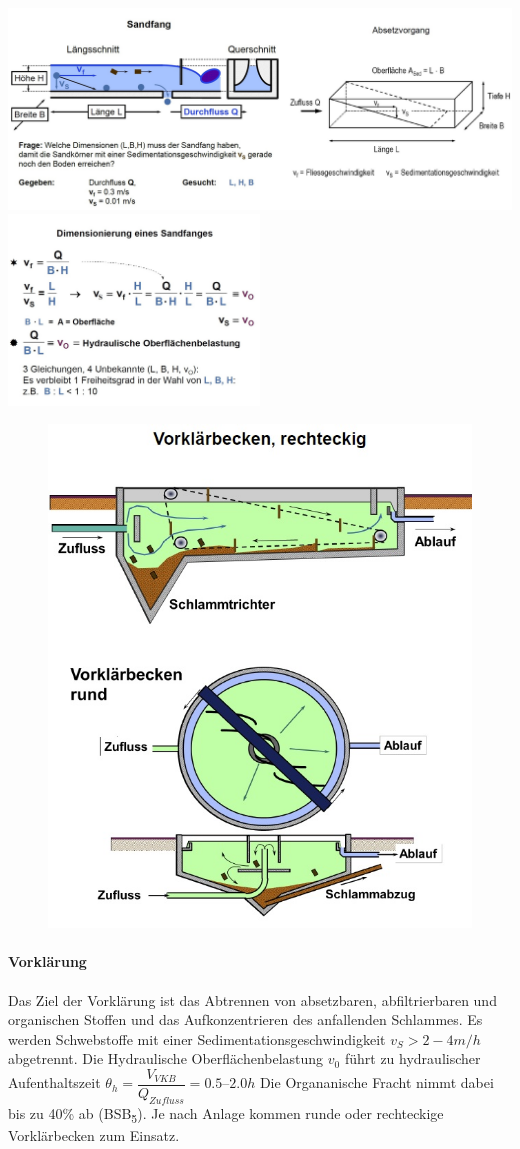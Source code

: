 \documentclass[9pt, openright=false]{scrartcl}
\begin{document}
\begin{center}
\includegraphics[width=1.0\textwidth]{images/dimensionsandfang1}
\includegraphics[width=0.5\textwidth]{images/dimensionsandfang2}
\end{center}\clearpage \begin{figure} 
  \includegraphics[width=.45\textwidth]{images/vorklaerbecken}
\end{figure}
\paragraph{Vorklärung} Das Ziel der Vorklärung ist das Abtrennen von absetzbaren, abfiltrierbaren und organischen Stoffen und das Aufkonzentrieren des anfallenden Schlammes. Es werden Schwebstoffe mit einer Sedimentationsgeschwindigkeit $v_S > 2 - 4 m/h$ abgetrennt. Die Hydraulische Oberflächenbelastung $v_0$ führt zu hydraulischer Aufenthaltszeit $\theta_h = \dfrac{V_{VKB}}{Q_{Zufluss}}= 0.5 – 2.0 h$ Die Organanische Fracht nimmt dabei bis zu 40\% ab (BSB\textsubscript{5}). Je nach Anlage kommen runde oder rechteckige Vorklärbecken zum Einsatz.
\end{document}
